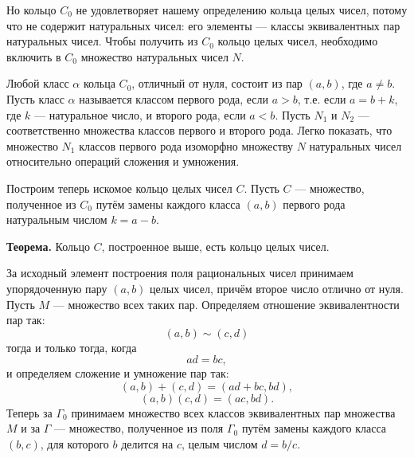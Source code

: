 \begin{rusblock}
Но кольцо $C_0$ не удовлетворяет нашему определению кольца целых чисел, потому что не содержит натуральных чисел: его элементы --- классы эквивалентных пар натуральных чисел. Чтобы получить из $C_0$ кольцо целых чисел, необходимо включить в $C_0$ множество натуральных чисел $N$.

Любой класс $\alpha$ кольца $C_0$, отличный от нуля, состоит из пар $(a,b)$, где $a\ne b$. Пусть класс $\alpha$ называется классом первого рода, если $a>b$, т.е. если $a=b+k$, где $k$ --- натуральное число, и второго рода, если $a<b$. Пусть $N_1$ и $N_2$ --- соответственно множества классов первого и второго рода. Легко показать, что множество $N_1$ классов первого рода изоморфно множеству $N$ натуральных чисел относительно операций сложения и умножения.

Построим теперь искомое кольцо целых чисел $C$. Пусть $C$ --- множество, полученное из $C_0$ путём замены каждого класса $(a,b)$ первого рода натуральным числом $k=a-b$.

\textbf{Теорема.} Кольцо $C$, построенное выше, есть кольцо целых чисел.
\end{rusblock}

\begin{rusblock}
За исходный элемент построения поля рациональных чисел принимаем упорядоченную пару $(a,b)$ целых чисел, причём второе число отлично от нуля. Пусть $M$ --- множество всех таких пар. Определяем отношение эквивалентности пар так:
\[
(a,b)\sim(c,d)
\]
тогда и только тогда, когда
\[
ad=bc,
\]
и определяем сложение и умножение пар так:
\[
(a,b)+(c,d)=(ad+bc,bd),
\]
\[
(a,b)(c,d)=(ac,bd).
\]
Теперь за $\Gamma_0$ принимаем множество всех классов эквивалентных пар множества $M$ и за $\Gamma$ --- множество, полученное из поля $\Gamma_0$ путём замены каждого класса $(b,c)$, для которого $b$ делится на $c$, целым числом $d=b/c$.
\end{rusblock}

